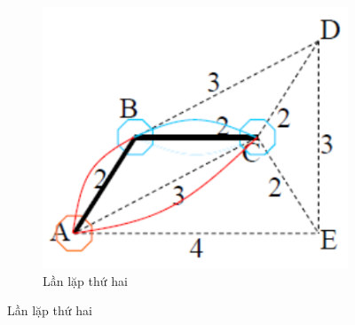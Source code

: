 \documentclass[a4paper, 11pt]{article}
\begin{document}
\begin{figure}[h]
\begin{subfigure}{.3\linewidth}
  \end{subfigure}
     \hfill
  \begin{subfigure}{.3\linewidth}
      \centering
      \includegraphics[width=\textwidth,height=\textheight,keepaspectratio]{ni_3.png}
      \caption{Lần lặp thứ hai}
  \end{subfigure}
  

\end{figure}
\end{document}
